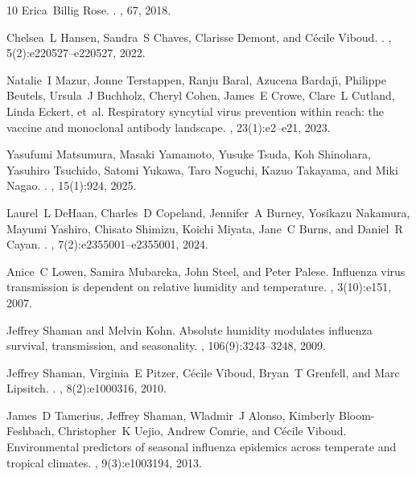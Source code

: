\documentclass[12pt]{article}
\begin{document}
\begin{thebibliography}{10}
Erica~Billig Rose.
.
, 67, 2018.

Chelsea~L Hansen, Sandra~S Chaves, Clarisse Demont, and C{\'e}cile Viboud.
.
, 5(2):e220527--e220527, 2022.

Natalie~I Mazur, Jonne Terstappen, Ranju Baral, Azucena Bardaj{\'\i}, Philippe Beutels, Ursula~J Buchholz, Cheryl Cohen, James~E Crowe, Clare~L Cutland, Linda Eckert, et~al.
\newblock Respiratory syncytial virus prevention within reach: the vaccine and monoclonal antibody landscape.
, 23(1):e2--e21, 2023.

Yasufumi Matsumura, Masaki Yamamoto, Yusuke Tsuda, Koh Shinohara, Yasuhiro Tsuchido, Satomi Yukawa, Taro Noguchi, Kazuo Takayama, and Miki Nagao.
.
, 15(1):924, 2025.

Laurel~L DeHaan, Charles~D Copeland, Jennifer~A Burney, Yosikazu Nakamura, Mayumi Yashiro, Chisato Shimizu, Koichi Miyata, Jane~C Burns, and Daniel~R Cayan.
.
, 7(2):e2355001--e2355001, 2024.

Anice~C Lowen, Samira Mubareka, John Steel, and Peter Palese.
\newblock Influenza virus transmission is dependent on relative humidity and temperature.
, 3(10):e151, 2007.

Jeffrey Shaman and Melvin Kohn.
\newblock Absolute humidity modulates influenza survival, transmission, and seasonality.
, 106(9):3243--3248, 2009.

Jeffrey Shaman, Virginia~E Pitzer, C{\'e}cile Viboud, Bryan~T Grenfell, and Marc Lipsitch.
.
, 8(2):e1000316, 2010.

James~D Tamerius, Jeffrey Shaman, Wladmir~J Alonso, Kimberly Bloom-Feshbach, Christopher~K Uejio, Andrew Comrie, and C{\'e}cile Viboud.
\newblock Environmental predictors of seasonal influenza epidemics across temperate and tropical climates.
, 9(3):e1003194, 2013.


\end{thebibliography}
\end{document}
